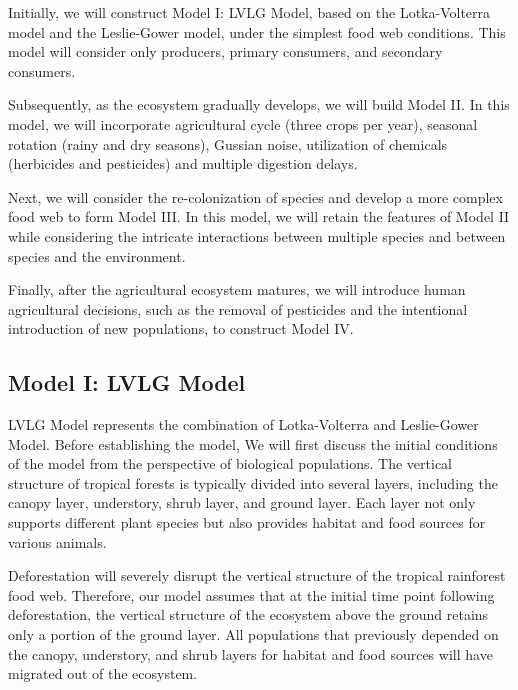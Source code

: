 \documentclass{HZNUMCM}
\begin{document}
        Initially, we will construct Model I: LVLG Model, based on the Lotka-Volterra model and the Leslie-Gower model, 
        under the simplest food web conditions. This model will consider only producers, primary consumers, and secondary consumers.

        Subsequently, as the ecosystem gradually develops, we will build Model II. 
        In this model, we will incorporate agricultural cycle (three crops per year), 
        seasonal rotation (rainy and dry seasons), Gussian noise, utilization of chemicals (herbicides and pesticides) and multiple digestion delays.
        
        Next, we will consider the re-colonization of species and develop a more complex food web to form Model III. 
        In this model, we will retain the features of Model II while considering the intricate interactions between multiple species and between species and the environment.

        Finally, after the agricultural ecosystem matures, we will introduce human agricultural decisions, 
        such as the removal of pesticides and the intentional introduction of new populations, to construct Model IV.
    \subsection{Model I: LVLG Model}
      LVLG Model represents the combination of Lotka-Volterra and Leslie-Gower Model. 
      Before establishing the model, We will first discuss the initial conditions of the model from the perspective of biological populations. 
      The vertical structure of tropical forests is typically divided into several layers, including the canopy layer, understory, shrub layer, and ground layer. 
      Each layer not only supports different plant species but also provides habitat and food sources for various animals. 
      
      Deforestation will severely disrupt the vertical structure of the tropical rainforest food web. 
      Therefore, our model assumes that at the initial time point following deforestation, 
      the vertical structure of the ecosystem above the ground retains only a portion of the ground layer. 
      All populations that previously depended on the canopy, understory, and shrub layers for habitat and food sources will have migrated out of the ecosystem.
\end{document}
